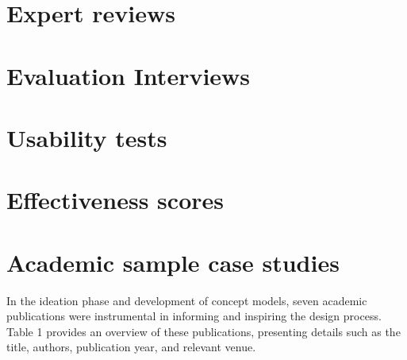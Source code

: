 \begin{appendices}
\section{Expert reviews}
\label{appendix:expert}

\section{Evaluation Interviews}
\label{appendix:evaluation}

\section{Usability tests}
\label{appendix:usability}

\section{Effectiveness scores}
\label{appendix:effectiveness}

\section{Academic sample case studies}
\label{appendix:academic}

In the ideation phase and development of concept models, seven academic publications were instrumental in informing and inspiring the design process. Table 1 provides an overview of these publications, presenting details such as the title, authors, publication year, and relevant venue.


\end{appendices}
